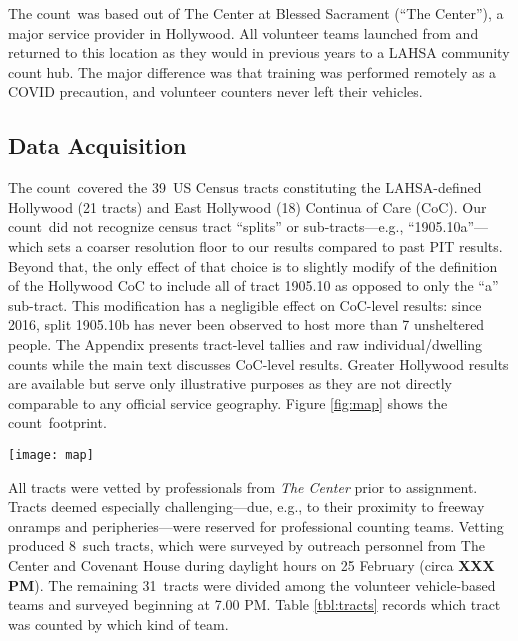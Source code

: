 \documentclass[11pt,twocolumn]{article}
\def\bfr{\bf\color{red}}
\def\Count{count}
\def\ntracts{39}
\def\nprof{8}
\def\nvol{31}
\begin{document}
The \Count\ was based out of The Center at Blessed Sacrament (``The Center''), a major service 
provider in Hollywood. All volunteer teams launched from and returned to this location as they would 
in previous years to a LAHSA community count hub. The major difference was that training was 
performed remotely as a COVID precaution, and volunteer counters never left their vehicles.

\subsection{Data Acquisition}
\label{sec:acquisition}

The \Count\ covered the \ntracts\ US Census tracts constituting the LAHSA-defined Hollywood 
(21 tracts) and East Hollywood (18) Continua of Care (CoC). Our \Count\ did not recognize census 
tract ``splits'' or sub-tracts---e.g., ``1905.10a''---which sets a coarser resolution floor to our results 
compared to past PIT results. Beyond that, the only effect of that choice is to slightly modify of the 
definition of the Hollywood CoC to include all of tract 1905.10 as opposed to only the ``a'' sub-tract. 
This modification has a negligible effect on CoC-level results: since 2016, split 1905.10b has never been 
observed to host more than 7 unsheltered people. The Appendix presents tract-level tallies and raw 
individual/dwelling counts while the main text discusses CoC-level results. Greater Hollywood 
results are available but serve only illustrative purposes as they are not directly comparable to any 
official service geography. Figure \ref{fig:map} shows the \Count\ footprint.

\begin{figure*}
	\centering
	\texttt{[image: map]}
	\caption{The 2021 volunteer \Count\ covered Greater Hollywood, comprising the 
			officially recognized LAHSA Hollywood and East Hollywood Continua
			of Care. The former stretches from Laurel Canyon Blvd to Western Ave,
			the latter from Western to Hoover Ave. Hollywood is bounded to the north
			and south respectively by Franklin	and Melrose Aves, with East Hollywood
			bounded by Hollywood Blvd and Beverly Ave. Hollywood comprises
			21 census tracts; East Hollywood 18. The grey lines above show census 
			sub-tracts used by LAHSA but ignored in this \Count.}
	\label{fig:map}	
\end{figure*}

All tracts were vetted by professionals from {\it The Center} prior to assignment. Tracts deemed 
especially challenging---due, e.g., to their proximity to freeway onramps and peripheries---were 
reserved for professional counting teams. Vetting produced \nprof\ such tracts, which were surveyed 
by outreach personnel from The Center and Covenant House during daylight hours on 25 
February (circa {\bfr XXX PM}). The remaining \nvol\ tracts were divided among the volunteer 
vehicle-based teams and surveyed beginning at 7.00 PM. Table \ref{tbl:tracts} records which tract
was counted by which kind of team.
\end{document}
